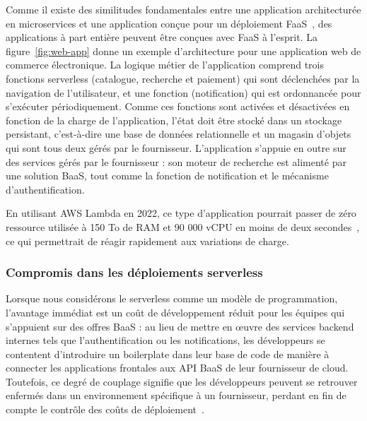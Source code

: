 Comme il existe des similitudes fondamentales entre une application architecturée en microservices et une application conçue pour un déploiement FaaS~\cite{jiaNightcoreEfficientScalable2021}, des applications à part entière peuvent être conçues avec FaaS à l'esprit. La figure~\ref{fig:web-app} donne un exemple d'architecture pour une application web de commerce électronique. La logique métier de l'application comprend trois fonctions serverless (catalogue, recherche et paiement) qui sont déclenchées par la navigation de l'utilisateur, et une fonction (notification) qui est ordonnancée pour s'exécuter périodiquement. Comme ces fonctions sont activées et désactivées en fonction de la charge de l'application, l'état doit être stocké dans un stockage persistant, c'est-à-dire une base de données relationnelle et un magasin d'objets qui sont tous deux gérés par le fournisseur. L'application s'appuie en outre sur des services gérés par le fournisseur : son moteur de recherche est alimenté par une solution BaaS, tout comme la fonction de notification et le mécanisme d'authentification.

En utilisant AWS Lambda en 2022, ce type d'application pourrait passer de zéro ressource utilisée à 150 To de RAM et 90 000 vCPU en moins de deux secondes~\cite{ionescu2022scaling}, ce qui permettrait de réagir rapidement aux variations de charge.

\subsubsection{Compromis dans les déploiements serverless}

Lorsque nous considérons le serverless comme un modèle de programmation, l'avantage immédiat est un coût de développement réduit pour les équipes qui s'appuient sur des offres BaaS : au lieu de mettre en œuvre des services backend internes tels que l'authentification ou les notifications, les développeurs se contentent d'introduire un boilerplate dans leur base de code de manière à connecter les applications frontales aux API BaaS de leur fournisseur de cloud. Toutefois, ce degré de couplage signifie que les développeurs peuvent se retrouver enfermés dans un environnement spécifique à un fournisseur, perdant en fin de compte le contrôle des coûts de déploiement~\cite{baarziMeritsViabilityMultiCloud2021}.

